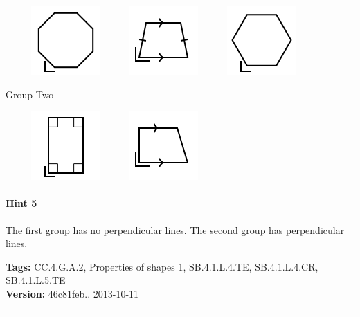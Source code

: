 \documentclass[twocolumn,10pt]{article}
\def\shrinkfactor{0.55}
\begin{document}
$\phantom{xxxx}$
\includegraphics[scale=\shrinkfactor]{figures/e545f7ea1f54d28f35d3f53800176fa61cfa576a.png}
$\phantom{xxxx}$
\includegraphics[scale=\shrinkfactor]{figures/0551b3aafe67b1364e8c26b46976f33448514e73.png}
$\phantom{xxxx}$
\includegraphics[scale=\shrinkfactor]{figures/86b2c3c3c0943d023a08a365d4a9966c85516b6a.png}

Group Two

$\phantom{xxxx}$
\includegraphics[scale=\shrinkfactor]{figures/d6d791274da0b0e2e00f611eecdc6fbff3b6f565.png}
$\phantom{xxxx}$
\includegraphics[scale=\shrinkfactor]{figures/b40fe0d71041d95a6048607b1a3b833ea4457558.png}

\paragraph{Hint 5}The first group has no perpendicular lines.  The second group has perpendicular lines.



\medskip
\noindent
\textbf{Tags:} {\footnotesize CC.4.G.A.2, Properties of shapes 1, SB.4.1.L.4.TE, SB.4.1.L.4.CR, SB.4.1.L.5.TE}\\
\textbf{Version:} 46c81feb.. 2013-10-11
\smallskip\hrule
\end{document}

